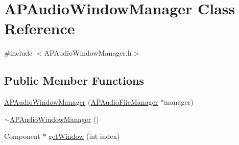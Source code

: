 \hypertarget{class_a_p_audio_window_manager}{\section{A\+P\+Audio\+Window\+Manager Class Reference}
\label{class_a_p_audio_window_manager}
}


{\ttfamily \#include $<$A\+P\+Audio\+Window\+Manager.\+h$>$}

\subsection*{Public Member Functions}
\begin{DoxyCompactItemize}
\item 
\hyperlink{class_a_p_audio_window_manager_a981bd8f80f360b0afaa525286cf5946e}{A\+P\+Audio\+Window\+Manager} (\hyperlink{class_a_p_audio_file_manager}{A\+P\+Audio\+File\+Manager} $\ast$manager)
\item 
\hyperlink{class_a_p_audio_window_manager_a6b504cebfd83ff5471fac66859017e0a}{$\sim$\+A\+P\+Audio\+Window\+Manager} ()
\item 
Component $\ast$ \hyperlink{class_a_p_audio_window_manager_a34d41420edbde5a1d997d33a944e7f7a}{get\+Window} (int index)
\end{DoxyCompactItemize}


